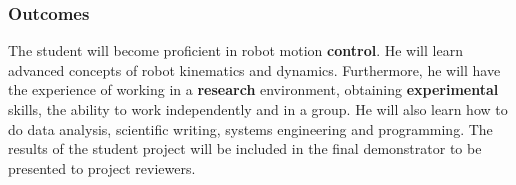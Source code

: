 \subsubsection{Outcomes}
The student will become proficient in robot motion \textbf{control}. He will learn advanced concepts of robot kinematics and dynamics.
Furthermore, he will have the experience of working in a \textbf{research} environment, obtaining \textbf{experimental} skills, the ability to work independently and in a group. He will also learn how to do data analysis, scientific writing, systems engineering and programming.
The results of the student project will be included in the final demonstrator to be presented to project reviewers.